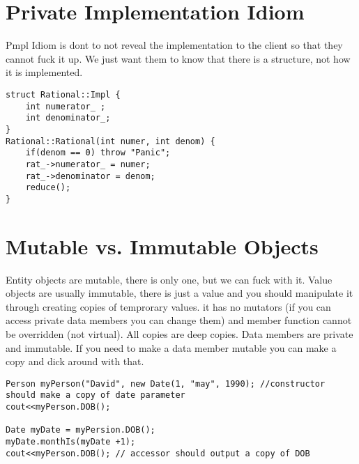 \documentclass[12pt]{article}
\begin{document}
\section*{Private Implementation Idiom}
Pmpl Idiom is dont to not reveal the implementation to the client so that they cannot fuck it up. We just want them to know that there is a structure, not how it is implemented. 
\begin{verbatim}
struct Rational::Impl {
    int numerator_ ;
    int denominator_;
}
Rational::Rational(int numer, int denom) {
    if(denom == 0) throw "Panic";
    rat_->numerator_ = numer;
    rat_->denominator = denom;
    reduce();
}

\end{verbatim}

\section*{Mutable vs. Immutable Objects}
Entity objects are mutable, there is only one, but we can fuck with it. Value objects are usually immutable, there is just a value and you should manipulate it through creating copies of temprorary values.  it has no mutators (if you can access private data members you can change them) and member function cannot be overridden (not virtual). All copies are deep copies. Data members are private and immutable. If you need to make a data member mutable you can make a copy and dick around with that.


\begin{verbatim}
Person myPerson("David", new Date(1, "may", 1990); //constructor should make a copy of date parameter
cout<<myPerson.DOB();

Date myDate = myPersion.DOB(); 
myDate.monthIs(myDate +1);
cout<<myPerson.DOB(); // accessor should output a copy of DOB
\end{verbatim}
\end{document}
